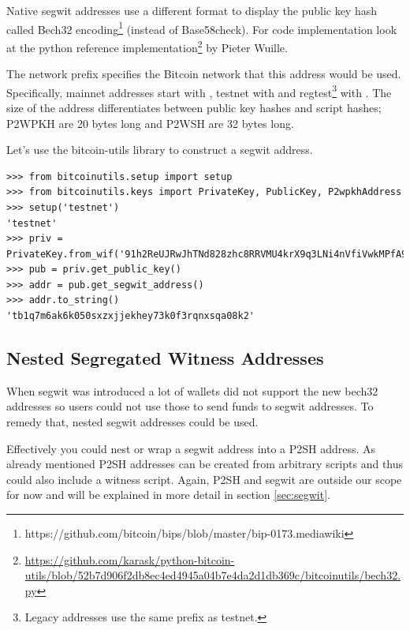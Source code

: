 Native segwit addresses use a different format to display the public key hash called Bech32 encoding\footnote{https://github.com/bitcoin/bips/blob/master/bip-0173.mediawiki} (instead of Base58check). For code implementation look at the python reference implementation\footnote{\url{https://github.com/karask/python-bitcoin-utils/blob/52b7d906f2db8ec4ed4945a04b7e4da2d1db369c/bitcoinutils/bech32.py}} by Pieter Wuille.

The network prefix specifies the Bitcoin network that this address would be used. Specifically, mainnet addresses start with , testnet with  and regtest\footnote{Legacy addresses use the same prefix as testnet.} with . The size of the address differentiates between public key hashes and script hashes; P2WPKH are 20 bytes long and P2WSH are 32 bytes long.

Let's use the bitcoin-utils library to construct a segwit address.

\vspace{1em}
\begin{lstlisting}[style=Python,label={lst:display-segwit-address},caption={Example of displaying a segwit address from a public key using Python},captionpos=b]
>>> from bitcoinutils.setup import setup
>>> from bitcoinutils.keys import PrivateKey, PublicKey, P2wpkhAddress
>>> setup('testnet')
'testnet' 
>>> priv = PrivateKey.from_wif('91h2ReUJRwJhTNd828zhc8RRVMU4krX9q3LNi4nVfiVwkMPfA9p')
>>> pub = priv.get_public_key()  
>>> addr = pub.get_segwit_address()
>>> addr.to_string() 
'tb1q7m6ak6k050sxzxjjekhey73k0f3rqnxsqa08k2'
\end{lstlisting}
\vspace{1em}



\subsection*{Nested Segregated Witness Addresses}

When segwit was introduced a lot of wallets did not support the new bech32 addresses so users could not use those to send funds to segwit addresses. To remedy that, nested segwit addresses could be used.

Effectively you could nest or wrap a segwit address into a P2SH address. As already mentioned P2SH addresses can be created from arbitrary scripts and thus could also include a witness script. Again, P2SH and segwit are outside our scope for now and will be explained in more detail in section \ref{sec:segwit}.

